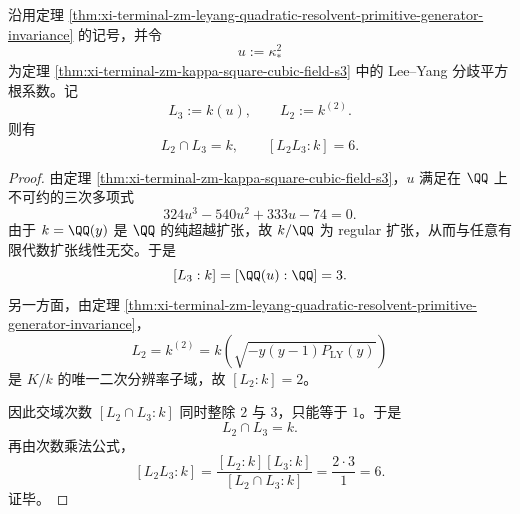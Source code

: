 \begin{theorem}[Lee--Yang 三次分支层与四次二次脊柱在 \texorpdfstring{$k=\QQ(y)$}{k=Q(y)} 上线性无交]\label{thm:xi-terminal-zm-leyang-cubic-layer-quadratic-spine-linear-disjoint-over-k}
沿用定理 \ref{thm:xi-terminal-zm-leyang-quadratic-resolvent-primitive-generator-invariance} 的记号，并令
\[
u:=\kappa_\ast^2
\]
为定理 \ref{thm:xi-terminal-zm-kappa-square-cubic-field-s3} 中的 Lee--Yang 分歧平方根系数。记
\[
L_3:=k(u),\qquad L_2:=k^{(2)}.
\]
则有
\[
L_2\cap L_3=k,
\qquad
[L_2L_3:k]=6.
\]
\end{theorem}
\begin{proof}
由定理 \ref{thm:xi-terminal-zm-kappa-square-cubic-field-s3}，\(u\) 满足在 \(\QQ\) 上不可约的三次多项式
\[
324u^3-540u^2+333u-74=0.
\]
由于 \(k=\QQ(y)\) 是 \(\QQ\) 的纯超越扩张，故 \(k/\QQ\) 为 regular 扩张，从而与任意有限代数扩张线性无交。于是
\[
[L_3:k]=[\QQ(u):\QQ]=3.
\]
另一方面，由定理 \ref{thm:xi-terminal-zm-leyang-quadratic-resolvent-primitive-generator-invariance}，
\[
L_2=k^{(2)}=k\!\left(\sqrt{-y(y-1)P_{\mathrm{LY}}(y)}\right)
\]
是 \(K/k\) 的唯一二次分辨率子域，故 \([L_2:k]=2\)。

因此交域次数 \([L_2\cap L_3:k]\) 同时整除 \(2\) 与 \(3\)，只能等于 \(1\)。于是
\[
L_2\cap L_3=k.
\]
再由次数乘法公式，
\[
[L_2L_3:k]
=
\frac{[L_2:k][L_3:k]}{[L_2\cap L_3:k]}
=
\frac{2\cdot 3}{1}
=6.
\]
证毕。
\end{proof}

